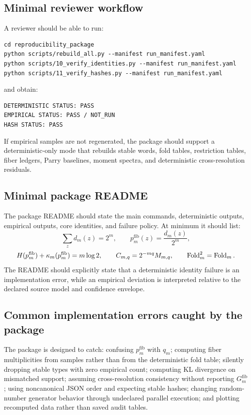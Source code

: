 \subsection{Minimal reviewer workflow}

A reviewer should be able to run:
\begin{verbatim}
cd reproducibility_package
python scripts/rebuild_all.py --manifest run_manifest.yaml
python scripts/10_verify_identities.py --manifest run_manifest.yaml
python scripts/11_verify_hashes.py --manifest run_manifest.yaml
\end{verbatim}
and obtain:
\begin{verbatim}
DETERMINISTIC STATUS: PASS
EMPIRICAL STATUS: PASS / NOT_RUN
HASH STATUS: PASS
\end{verbatim}
If empirical samples are not regenerated, the package should support a deterministic-only mode that rebuilds stable words, fold tables, restriction tables, fiber ledgers, Parry baselines, moment spectra, and deterministic cross-resolution residuals.

\subsection{Minimal package README}

The package README should state the main commands, deterministic outputs, empirical outputs, core identities, and failure policy.  At minimum it should list:
\[
\sum_zd_m(z)=2^m,\qquad
p_m^{\mathrm{fib}}(z)=\frac{d_m(z)}{2^m},
\]
\[
H(p_m^{\mathrm{fib}})+\kappa_m(p_m^{\mathrm{fib}})=m\log2,
\qquad
C_{m,q}=2^{-mq}M_{m,q},
\qquad
\operatorname{Fold}_m^2=\operatorname{Fold}_m.
\]
The README should explicitly state that a deterministic identity failure is an implementation error, while an empirical deviation is interpreted relative to the declared source model and confidence envelope.

\subsection{Common implementation errors caught by the package}

The package is designed to catch: confusing \(p_m^{\mathrm{fib}}\) with \(q_m\); computing fiber multiplicities from samples rather than from the deterministic fold table; silently dropping stable types with zero empirical count; computing KL divergence on mismatched support; assuming cross-resolution consistency without reporting \(G_m^{\mathrm{fib}}\); using noncanonical JSON order and expecting stable hashes; changing random-number generator behavior through undeclared parallel execution; and plotting recomputed data rather than saved audit tables.
